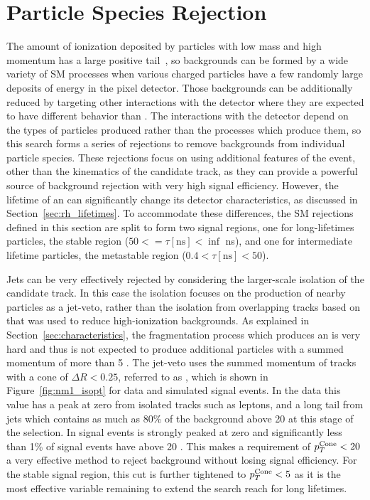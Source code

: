 
\section{Particle Species Rejection}
\label{sec:sm_rejection}

The amount of ionization deposited by particles with low mass and high momentum has a large positive tail~\cite{pdg}, so backgrounds can be formed by a wide variety of \ac{SM} processes when various charged particles have a few randomly large deposits of energy in the pixel detector.
Those backgrounds can be additionally reduced by targeting other interactions with the detector where they are expected to have different behavior than \rhadrons.
The interactions with the detector depend on the types of particles produced rather than the processes which produce them, so this search forms a series of rejections to remove backgrounds from individual particle species.
These rejections focus on using additional features of the event, other than the kinematics of the candidate track, as they can provide a powerful source of background rejection with very high signal efficiency.
However, the lifetime of an \rhadron can significantly change its detector characteristics, as discussed in Section~\ref{sec:rh_lifetimes}.
To accommodate these differences, the \ac{SM} rejections defined in this section are split to form two signal regions, one for long-lifetimes particles, the stable region ($50 <= \tau [\mathrm{ns}] < \inf$ ns), and one for intermediate lifetime particles, the metastable region ($0.4 < \tau [\mathrm{ns}] < 50$).

Jets can be very effectively rejected by considering the larger-scale isolation of the candidate track.
In this case the isolation focuses on the production of nearby particles as a jet-veto, rather than the isolation from overlapping tracks based on \Nsplit that was used to reduce high-ionization backgrounds.
As explained in Section~\ref{sec:characteristics}, the fragmentation process which produces an \rhadron is very hard and thus is not expected to produce additional particles with a summed momentum of more than 5 \GeV.
The jet-veto uses the summed momentum of tracks with a cone of $\Delta R < 0.25$, referred to as \ptcone, which is shown in Figure~\ref{fig:nm1_isopt} for data and simulated signal events. 
In the data this value has a peak at zero from isolated tracks such as leptons, and a long tail from jets which contains as much as 80\% of the background above 20 \GeV at this stage of the selection.
In signal events \ptcone is strongly peaked at zero and significantly less than 1\%  of signal events have \ptcone above 20 \GeV. 
This makes a requirement of $p_T^\mathrm{Cone} < 20$ \GeV a very effective method to reject background without losing signal efficiency.
For the stable signal region, this cut is further tightened to $p_T^\mathrm{Cone} < 5$ \GeV as it is the most effective variable remaining to extend the search reach for long lifetimes.

